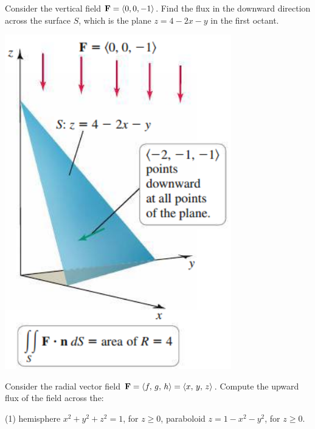 \documentclass[mathNotesPreamble]{subfiles}
\begin{document}
  \begin{ex*}
    Consider the vertical field $\mathbf F={\left\langle 0,0,-1 \right\rangle}$. Find the flux in the downward direction across the surface $S$, which is the plane $z=4-2x-y$ in the first octant.
  \end{ex*}
  \begin{flushright}
    \includegraphics[width=0.25\linewidth]{images/briggs_17_06/fig17_58}
  \end{flushright}
  \pagebreak

  \begin{ex*}
    Consider the radial vector field $\mathbf F={\left\langle f,\,g,\,h \right\rangle}={\left\langle x,\,y,\,z \right\rangle}$.  Compute the upward flux of the field across the:
  \end{ex*}
  \begin{tasks}[after-item-skip=\stretch{1}, label=](1)
    \task hemisphere $x^2+y^2+z^2=1$, for $z\geq 0$,
    \task paraboloid $z=1-x^2-y^2$, for $z\geq 0$.
  \end{tasks}
  \pagebreak
\end{document}

